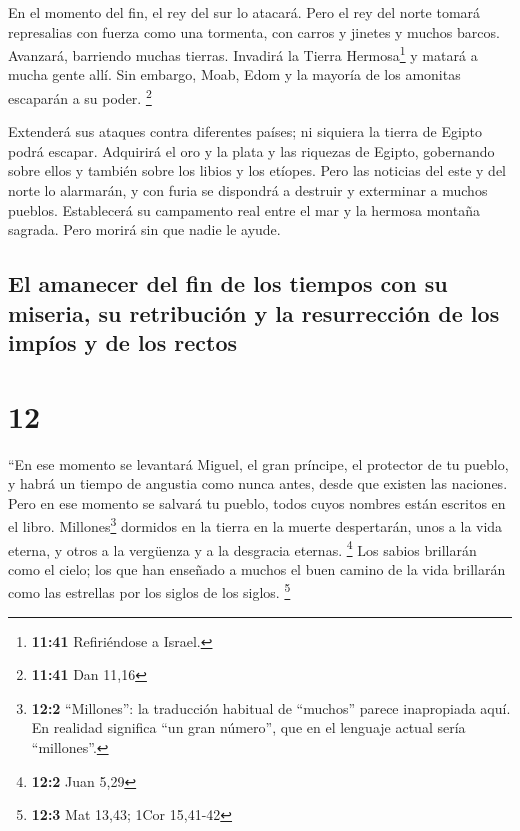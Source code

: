  En el momento del fin, el rey del sur lo atacará. Pero
el rey del norte tomará represalias con fuerza como una tormenta, con
carros y jinetes y muchos barcos. Avanzará, barriendo muchas tierras.
 Invadirá la Tierra Hermosa\footnote{\textbf{11:41}
  Refiriéndose a Israel.} y matará a mucha gente allí. Sin embargo,
Moab, Edom y la mayoría de los amonitas escaparán a su poder.
\footnote{\textbf{11:41} Dan 11,16}

 Extenderá sus ataques contra diferentes países; ni
siquiera la tierra de Egipto podrá escapar.  Adquirirá el
oro y la plata y las riquezas de Egipto, gobernando sobre ellos y
también sobre los libios y los etíopes.  Pero las
noticias del este y del norte lo alarmarán, y con furia se dispondrá a
destruir y exterminar a muchos pueblos.  Establecerá su
campamento real entre el mar y la hermosa montaña sagrada. Pero morirá
sin que nadie le ayude.

\hypertarget{el-amanecer-del-fin-de-los-tiempos-con-su-miseria-su-retribuciuxf3n-y-la-resurrecciuxf3n-de-los-impuxedos-y-de-los-rectos}{%
\subsection{El amanecer del fin de los tiempos con su miseria, su
retribución y la resurrección de los impíos y de los
rectos}\label{el-amanecer-del-fin-de-los-tiempos-con-su-miseria-su-retribuciuxf3n-y-la-resurrecciuxf3n-de-los-impuxedos-y-de-los-rectos}}

\hypertarget{section-11}{%
\section{12}\label{section-11}}

 ``En ese momento se levantará Miguel, el gran príncipe,
el protector de tu pueblo, y habrá un tiempo de angustia como nunca
antes, desde que existen las naciones. Pero en ese momento se salvará tu
pueblo, todos cuyos nombres están escritos en el libro. 
Millones\footnote{\textbf{12:2} ``Millones'': la traducción habitual de
  ``muchos'' parece inapropiada aquí. En realidad significa ``un gran
  número'', que en el lenguaje actual sería ``millones''.} dormidos en
la tierra en la muerte despertarán, unos a la vida eterna, y otros a la
vergüenza y a la desgracia eternas. \footnote{\textbf{12:2} Juan 5,29}
 Los sabios brillarán como el cielo; los que han enseñado
a muchos el buen camino de la vida brillarán como las estrellas por los
siglos de los siglos. \footnote{\textbf{12:3} Mat 13,43; 1Cor 15,41-42}

